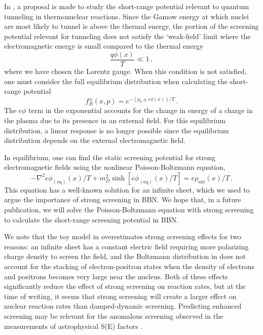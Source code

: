 In \cite{Grayson:2023flr}, a proposal is made to study the short-range potential relevant to quantum tunneling in thermonuclear reactions. Since the Gamow energy at which nuclei are most likely to tunnel is above the thermal energy, the portion of the screening potential relevant for tunneling does not satisfy the `weak-field' limit where the electromagnetic energy is small compared to the thermal energy
\begin{equation}
 \frac{q \phi(x)}{T} \ll 1\,,
\end{equation}
{\color{black}where we have chosen the Lorentz gauge}. When this condition is not satisfied, one must consider the full equilibrium distribution when calculating the short-range potential \cite{Hakim:1967prd,DeGroot:1980dk}
\begin{equation}\label{eq:Boltz}
 f_B^\pm(x,p) = e^{-(p_0\pm e\phi(x))/T}\,.
\end{equation}
The $e\phi$ term in the exponential accounts for the change in energy of a charge in the plasma due to its presence in an external field. For this equilibrium distribution, a linear response is no longer possible since the equilibrium distribution depends on the external electromagnetic field. 

In equilibrium, one can find the static screening potential for strong electromagnetic fields using the nonlinear Poisson-Boltzmann equation,
\begin{equation}\label{eq:Poisson-Boltz}
 -\nabla^2 e\phi_{(\text{eq})}(x)/T +m_D^2\sinh\left[e\phi_{(\text{eq})}(x)/T\right] =e\rho_\mathrm{ext}(x)/T\,.
 \end{equation}
This equation has a well-known solution for an infinite sheet, which we used to argue the importance of strong screening in BBN. We hope that, in a future publication, we will solve the Poisson-Boltzmann equation with strong screening to calculate the short-range screening potential in BBN. 

We note that the toy model in \cite{Grayson:2023flr} overestimates strong screening effects for two reasons: an infinite sheet has a constant electric field requiring more polarizing charge density to screen the field, and the Boltzmann distribution in  does not account for the stacking of electron-positron states when the density of electrons and positrons becomes very large near the nucleus. Both of these effects significantly reduce the effect of strong screening on reaction rates, but at the time of writing, it seems that strong screening will create a larger effect on nuclear reaction rates than damped-dynamic screening. Predicting enhanced screening may be relevant for the anomalous screening observed in the measurements of astrophysical S(E) factors \cite{Zhang:2020nuc}.
 
